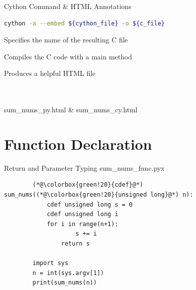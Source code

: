 \documentclass[11pt]{beamer}
\newcommand{\emptyline}{$ $\\}
\begin{document}
\begin{frame}[fragile]{Cython Command \& HTML Annotations}
	\begin{lstlisting}[language=Bash]
		cython -a --embed ${cython_file} -o ${c_file}
	\end{lstlisting}
	
	\begin{description}[<+->]
		\item[-o \$\{c\_file\}] Specifies the name of the resulting C file
		\item[--embed] Compiles the C code with a main method 
		\item[-a] Produces a helpful HTML file
	\end{description}
	
	\pause[\thebeamerpauses]
	\emptyline
	\emptyline
	sum\_nums\_py.html \& sum\_nums\_cy.html
\end{frame}

\section{Function Declaration}
\begin{frame}[fragile]{Return and Parameter Typing}
	sum\_nums\_func.pyx
	\begin{lstlisting}
		(*@\colorbox{green!20}{cdef}@*) sum_nums((*@\colorbox{green!20}{unsigned long}@*) n):
		    cdef unsigned long s = 0
		    cdef unsigned long i
		    for i in range(n+1):
		    	    s += i
		    	return s
		
		import sys
		n = int(sys.argv[1])
		print(sum_nums(n))
	\end{lstlisting}
\end{frame}
\end{document}
